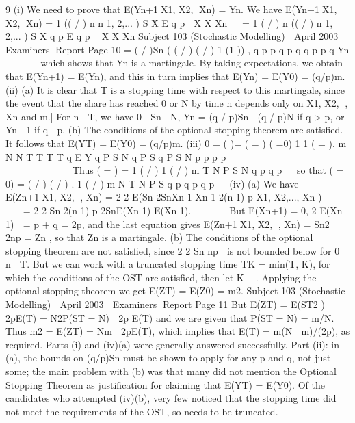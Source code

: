 9 (i) We need to prove that E(Yn+1X1, X2, Xn) = Yn.
We have
E(Yn+1X1, X2, Xn) = 1 (( / ) n n 1, 2,... ) S X
E q p  X X Xn
 
= 1 ( / ) n (( / ) n 1, 2,... ) S X
q p E q p  X X Xn
Subject 103 (Stochastic Modelling)  April 2003  Examiners Report
Page 10
= ( / )Sn ( ( / ) ( / ) 1 (1 )) ,
q p p q p q q p p q Yn      
which shows that Yn is a martingale.
By taking expectations, we obtain that E(Yn+1) = E(Yn), and this in turn implies
that E(Yn) = E(Y0) = (q/p)m.
(ii) (a) It is clear that T is a stopping time with respect to this martingale, since
the event that the share has reached 0 or N by time n depends only on
X1, X2, , Xn and m.]
For n  T, we have 0  Sn  N,
Yn = (q / p)Sn  (q / p)N if q > p, or Yn  1 if q  p.
(b) The conditions of the optional stopping theorem are satisfied. It
follows that E(YT) = E(Y0) = (q/p)m.
(iii)
0
= ( )= ( = ) ( =0) 1 1 ( = ).
m N N
T T T T
q E Y q P S N q P S q P S N
p p p p
         
               	  	  	   	   	
Thus ( = ) = 1 ( / )
1 ( / )
m
T N
P S N q p
q p


so that ( = 0) = ( / ) ( / ) .
1 ( / )
m N
T N
P S q p q p
q p


(iv) (a) We have
E(Zn+1X1, X2, , Xn) = 2 2
E(Sn 2SnXn 1 Xn 1 2(n 1) p X1, X2,..., Xn )       
= 2 2
Sn 2(n 1) p 2SnE(Xn 1) E(Xn 1).  
   
But E(Xn+1) = 0, 2
E(Xn 1)  = p + q = 2p, and the last equation gives
E(Zn+1X1, X2, , Xn) = Sn2  2np = Zn , so that {Zn} is a martingale.
(b) The conditions of the optional stopping theorem are not satisfied, since
2 2 Sn np  is not bounded below for 0  n  T. But we can work with a
truncated stopping time TK = min(T, K), for which the conditions of the
OST are satisfied, then let K  .
Applying the optional stopping theorem we get
E(ZT) = E(Z0) = m2.
Subject 103 (Stochastic Modelling)  April 2003  Examiners Report
Page 11
But E(ZT) = E(ST2 ) 	2pE(T) = N2P(ST = N)  2p E(T) and we are
given that P(ST = N) = m/N. Thus m2 = E(ZT) = Nm  2pE(T), which
implies that E(T) = m(N  m)/(2p), as required.
Parts (i) and (iv)(a) were generally answered successfully.
Part (ii): in (a), the bounds on (q/p)Sn must be shown to apply for any p and q, not
just some; the main problem with (b) was that many did not mention the Optional
Stopping Theorem as justification for claiming that E(YT) = E(Y0).
Of the candidates who attempted (iv)(b), very few noticed that the stopping time did
not meet the requirements of the OST, so needs to be truncated.
